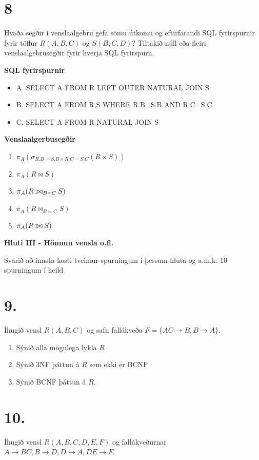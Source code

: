 \documentclass{article}
\def\ojoin{\setbox0=\hbox{$\bowtie$}%
  \rule[-.02ex]{.25em}{.4pt}\llap{\rule[\ht0]{.25em}{.4pt}}}
\def\leftouterjoin{\mathbin{\ojoin\mkern-5.8mu\bowtie}}
\newcommand{\bo}[1]{\textbf{#1}}
\newcommand{\enum}{\begin{enumerate}[label = \alph*.]}
\begin{document}
\vspace{1cm}

\section{8}
Hvaða segðir í venslaalgebru gefa sömu útkomu og eftirfarandi
SQL fyrirspurnir fyrir töflur $R(A, B, C)$ og $S(B, C, D)$? Tiltakið núll eða
fleiri venslaalgebrusegðir fyrir hverja SQL fyrirspurn.

\bo{SQL fyrirspurnir}
\begin{itemize}
    \item A. SELECT A FROM R LEFT OUTER NATURAL JOIN S
    \item B. SELECT A FROM R,S WHERE R.B=S.B AND R.C=S.C
    \item C. SELECT A FROM R NATURAL JOIN S
\end{itemize}
\bo{Venslaalgerbusegðir}
\enum
\item $\pi_A(\sigma_{R.B=S.B\wedge R.C=S.C}(R\times S))$
\item $\pi_A(R \bowtie S)$
\item $\pi_A(R \leftouterjoin_{B=C}S)$
\item $\pi_A(R \bowtie_{B=C}S)$
\item $\pi_A(R \leftouterjoin S)$
\end{enumerate}

\newpage

\begin{center}
    \bo{Hluti III - Hönnun vensla o.fl.}

    Svarið að innsta kosti tveimur spurningum í þessum 
    hluta og a.m.k. 10 spurningum í heild

\end{center}

\section{9.}
Íhugið vensl $R(A, B, C)$ og safn fallákveða $F = \{AC \rightarrow B, B \rightarrow A\}$.

\enum
\item Sýnið alla mögulega lykla $R$
\item Sýnið 3NF þáttun á $R$ sem ekki er BCNF
\item Sýnið BCNF þáttun á $R$.
\end{enumerate}

\vspace{1cm}

\section{10.}
Íhugið vensl $R(A, B, C, D, E, F)$ og fallákveðurnar
$A \rightarrow BC, B \rightarrow D, D \rightarrow A, DE \rightarrow F$.
\end{document}
